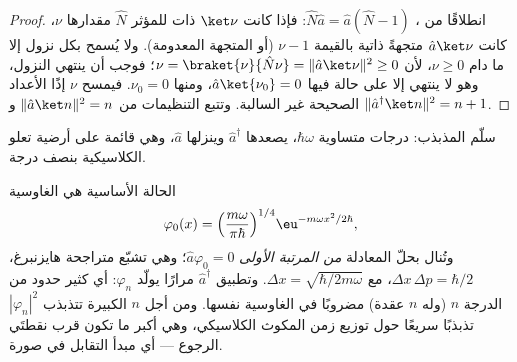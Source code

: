 \begin{proof}
انطلاقًا من ، $\hat N\hat a = \hat a(\hat N - 1)$: فإذا كانت
$\ket\nu$ ذات  للمؤثر $\hat N$ مقدارها $\nu$، كانت $\hat a\ket\nu$
متجهةً ذاتية بالقيمة $\nu - 1$ (أو المتجهة المعدومة). ولا يُسمح بكل
نزول إلا ما دام $\nu \ge 0$، لأن $\nu = \braket{\nu}{\hat
N\nu} = \|\hat a\ket\nu\|^2 \ge 0$؛ فوجب أن ينتهي النزول،
وهو لا ينتهي إلا على حالة فيها $\hat a\ket{\nu_0}
= 0$، ومنها $\nu_0 = 0$. فيمسح $\nu$ إذًا الأعداد الصحيحة
غير السالبة. وتتبع التنظيمات من $\|\hat a\ket n\|^2 = n$
و $\|\hat a^\dagger\ket n\|^2 = n + 1$.
\end{proof}

\begin{omfigure}

{\small سلّم المذبذب: درجات متساوية $\hbar\omega$، يصعدها
$\hat a^\dagger$ وينزلها $\hat a$، وهي قائمة على أرضية
تعلو  الكلاسيكية بنصف درجة.}
\end{omfigure}

\begin{proposition}\label{prop:b3:harmonic-oscillator:wavefunctions}
الحالة الأساسية هي الغاوسية
\[
\varphi_0(x) = \Big(\frac{m\omega}{\pi\hbar}\Big)^{1/4}
\eu^{-m\omega x^2/2\hbar} ,
\]
وتُنال بحلّ المعادلة \emph{من المرتبة الأولى} $\hat a\varphi_0
= 0$؛ وهي تشبّع متراجحة هايزنبرغ، $\Delta x\,\Delta p =
\hbar/2$، مع $\Delta x = \sqrt{\hbar/2m\omega}$. وتطبيق
$\hat a^\dagger$ مرارًا يولّد $\varphi_n$: أي كثير حدود من
الدرجة $n$ (وله $n$ عقدة) مضروبًا في الغاوسية نفسها. ومن أجل $n$ الكبيرة
تتذبذب $|\varphi_n|^2$ تذبذبًا سريعًا حول توزيع زمن المكوث
الكلاسيكي، وهي أكبر ما تكون قرب نقطتَي الرجوع --- أي مبدأ
التقابل في صورة.
\end{proposition}

